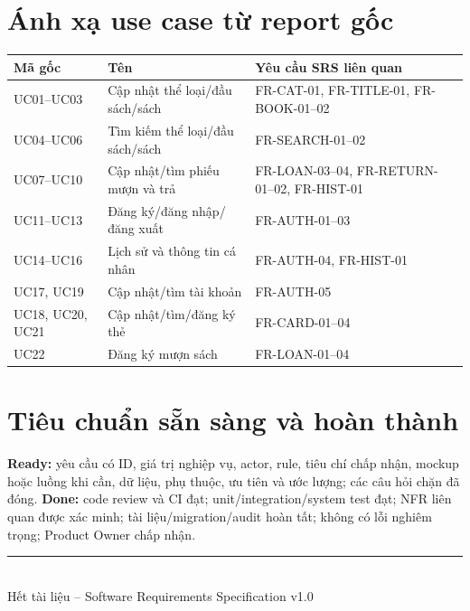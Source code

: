 \documentclass[12pt,a4paper,oneside]{report}
\begin{document}
\appendix
\chapter{Ánh xạ use case từ report gốc}
\begin{longtable}{L{2cm}L{5cm}L{7cm}}
\toprule Mã gốc & Tên & Yêu cầu SRS liên quan\\\midrule\endhead
UC01--UC03 & Cập nhật thể loại/đầu sách/sách & FR-CAT-01, FR-TITLE-01, FR-BOOK-01--02\\
UC04--UC06 & Tìm kiếm thể loại/đầu sách/sách & FR-SEARCH-01--02\\
UC07--UC10 & Cập nhật/tìm phiếu mượn và trả & FR-LOAN-03--04, FR-RETURN-01--02, FR-HIST-01\\
UC11--UC13 & Đăng ký/đăng nhập/đăng xuất & FR-AUTH-01--03\\
UC14--UC16 & Lịch sử và thông tin cá nhân & FR-AUTH-04, FR-HIST-01\\
UC17, UC19 & Cập nhật/tìm tài khoản & FR-AUTH-05\\
UC18, UC20, UC21 & Cập nhật/tìm/đăng ký thẻ & FR-CARD-01--04\\
UC22 & Đăng ký mượn sách & FR-LOAN-01--04\\
\bottomrule
\end{longtable}

\chapter{Tiêu chuẩn sẵn sàng và hoàn thành}
\sloppy\textbf{Ready:} yêu cầu có ID, giá trị nghiệp vụ, actor, rule, tiêu chí chấp nhận, mockup hoặc luồng khi cần, dữ liệu, phụ thuộc, ưu tiên và ước lượng; các câu hỏi chặn đã đóng. \textbf{Done:} code review và CI đạt; unit/integration/system test đạt; NFR liên quan được xác minh; tài liệu/migration/audit hoàn tất; không có lỗi nghiêm trọng; Product Owner chấp nhận.\fussy

\vfill
\begin{center}\color{HUFLITblue}\rule{0.65\textwidth}{0.8pt}\\
\small Hết tài liệu -- Software Requirements Specification v1.0
\end{center}
\end{document}
